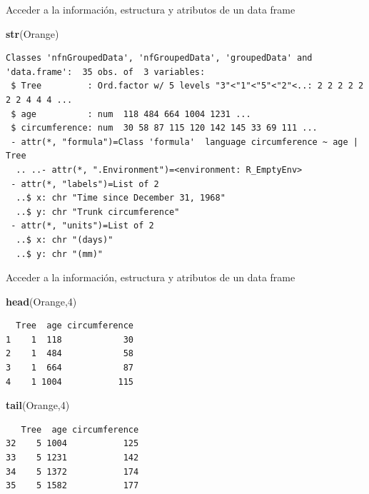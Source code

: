 \documentclass[
  ignorenonframetext,
]{beamer}
\newenvironment{Shaded}{\begin{snugshade}}{\end{snugshade}}
\newcommand{\DecValTok}[1]{\textcolor[rgb]{0.00,0.00,0.81}{#1}}
\newcommand{\FunctionTok}[1]{\textcolor[rgb]{0.13,0.29,0.53}{\textbf{#1}}}
\newcommand{\NormalTok}[1]{#1}
\begin{document}
\begin{frame}[fragile]{Acceder a la información, estructura y atributos
de un data frame}
\label{acceder-a-la-informaciuxf3n-estructura-y-atributos-de-un-data-frame-1}
\begin{Shaded}
\begin{Highlighting}[]
\FunctionTok{str}\NormalTok{(Orange)}
\end{Highlighting}
\end{Shaded}

\begin{verbatim}
Classes 'nfnGroupedData', 'nfGroupedData', 'groupedData' and 'data.frame':  35 obs. of  3 variables:
 $ Tree         : Ord.factor w/ 5 levels "3"<"1"<"5"<"2"<..: 2 2 2 2 2 2 2 4 4 4 ...
 $ age          : num  118 484 664 1004 1231 ...
 $ circumference: num  30 58 87 115 120 142 145 33 69 111 ...
 - attr(*, "formula")=Class 'formula'  language circumference ~ age | Tree
  .. ..- attr(*, ".Environment")=<environment: R_EmptyEnv> 
 - attr(*, "labels")=List of 2
  ..$ x: chr "Time since December 31, 1968"
  ..$ y: chr "Trunk circumference"
 - attr(*, "units")=List of 2
  ..$ x: chr "(days)"
  ..$ y: chr "(mm)"
\end{verbatim}
\end{frame}

\begin{frame}[fragile]{Acceder a la información, estructura y atributos
de un data frame}
\label{acceder-a-la-informaciuxf3n-estructura-y-atributos-de-un-data-frame-2}
\begin{Shaded}
\begin{Highlighting}[]
\FunctionTok{head}\NormalTok{(Orange,}\DecValTok{4}\NormalTok{)}
\end{Highlighting}
\end{Shaded}

\begin{verbatim}
  Tree  age circumference
1    1  118            30
2    1  484            58
3    1  664            87
4    1 1004           115
\end{verbatim}

\begin{Shaded}
\begin{Highlighting}[]
\FunctionTok{tail}\NormalTok{(Orange,}\DecValTok{4}\NormalTok{)}
\end{Highlighting}
\end{Shaded}

\begin{verbatim}
   Tree  age circumference
32    5 1004           125
33    5 1231           142
34    5 1372           174
35    5 1582           177
\end{verbatim}
\end{frame}
\end{document}
